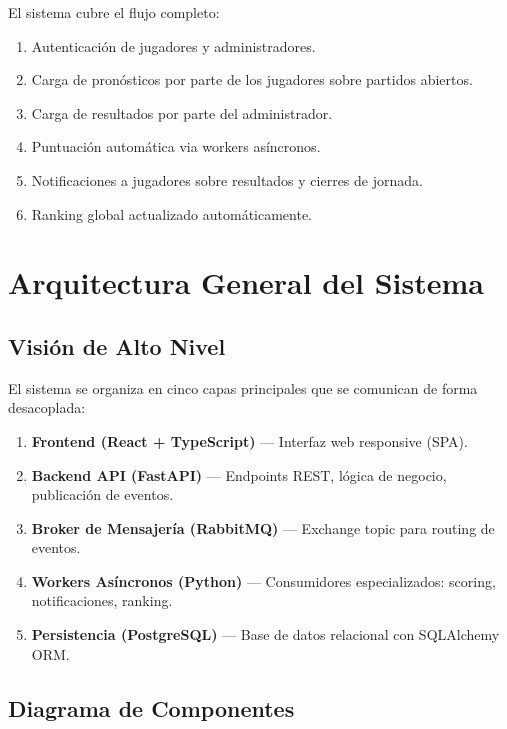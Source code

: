 \documentclass[12pt,a4paper]{article}
\begin{document}
El sistema cubre el flujo completo:
\begin{enumerate}
  \item Autenticación de jugadores y administradores.
  \item Carga de pronósticos por parte de los jugadores sobre partidos abiertos.
  \item Carga de resultados por parte del administrador.
  \item Puntuación automática via workers asíncronos.
  \item Notificaciones a jugadores sobre resultados y cierres de jornada.
  \item Ranking global actualizado automáticamente.
\end{enumerate}

\section{Arquitectura General del Sistema}

\subsection{Visión de Alto Nivel}

El sistema se organiza en cinco capas principales que se comunican de forma desacoplada:

\begin{accentbox}
\begin{enumerate}
  \item \textbf{Frontend (React + TypeScript)} — Interfaz web responsive (SPA).
  \item \textbf{Backend API (FastAPI)} — Endpoints REST, lógica de negocio, publicación de eventos.
  \item \textbf{Broker de Mensajería (RabbitMQ)} — Exchange topic para routing de eventos.
  \item \textbf{Workers Asíncronos (Python)} — Consumidores especializados: scoring, notificaciones, ranking.
  \item \textbf{Persistencia (PostgreSQL)} — Base de datos relacional con SQLAlchemy ORM.
\end{enumerate}
\end{accentbox}

\subsection{Diagrama de Componentes}
\end{document}
